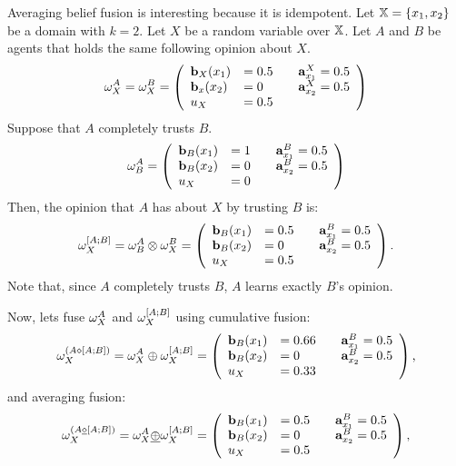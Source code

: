 \documentclass[a4paper,12pt]{article}
\theoremstyle{definition}
\theoremstyle{theorem}
\numberwithin{equation}{section}
\begin{document}
Averaging belief fusion is interesting because it is idempotent. Let $\mathbb{X} = \{x_1, x_2\}$ be a domain with $k = 2$. Let $X$ be a random variable over $\mathbb{X}$. Let $A$ and $B$ be agents that holds the same following opinion about $X$.
\begin{equation}
\omega^{A}_{X} = \omega^{B}_{X} =
\left(
\begin{array}{llll}
\mathbf{b}_{X}(x_1) & = 0.5 & & \mathbf{a}^{X}_{x_1} = 0.5 \\
\mathbf{b}_{x}(x_2) & = 0 & & \mathbf{a}^{X}_{x_2} = 0.5 \\
u_X & = 0.5
\end{array}
\right)
\end{equation}
Suppose that $A$ completely trusts $B$.
\begin{equation}
\omega^{A}_{B} =
\left(
\begin{array}{llll}
\mathbf{b}_{B}(x_1) & = 1 & & \mathbf{a}^{B}_{x_1} = 0.5 \\
\mathbf{b}_{B}(x_2) & = 0 & & \mathbf{a}^{B}_{x_2} = 0.5 \\
u_X & = 0
\end{array}
\right)
\end{equation}
Then, the opinion that $A$ has about $X$ by trusting $B$ is:
\begin{equation}
\omega^{[A;B]}_{X} = \omega^{A}_{B} \otimes \omega^{B}_{X} =
\left(
\begin{array}{llll}
\mathbf{b}_{B}(x_1) & = 0.5 & & \mathbf{a}^{B}_{x_1} = 0.5 \\
\mathbf{b}_{B}(x_2) & = 0 & & \mathbf{a}^{B}_{x_2} = 0.5 \\
u_X & = 0.5
\end{array}
\right) \text{.}
\end{equation}
Note that, since $A$ completely trusts $B$, $A$ learns exactly $B$'s opinion.

Now, lets fuse $\omega^{A}_{X}$ and $\omega^{[A;B]}_{X}$ using cumulative fusion:
\begin{equation}
\omega^{(A \diamond [A; B])}_{X} = \omega^{A}_{X} \oplus \omega^{[A;B]}_{X} =\left(
\begin{array}{llll}
\mathbf{b}_{B}(x_1) & = 0.66 & & \mathbf{a}^{B}_{x_1} = 0.5 \\
\mathbf{b}_{B}(x_2) & = 0 & & \mathbf{a}^{B}_{x_2} = 0.5 \\
u_X & = 0.33
\end{array}
\right) \text{,}
\end{equation}
and averaging fusion:
\begin{equation}
\omega^{(A \underline{\diamond} [A; B])}_{X} = \omega^{A}_{X} \underline{\oplus} \omega^{[A;B]}_{X} =\left(
\begin{array}{llll}
\mathbf{b}_{B}(x_1) & = 0.5 & & \mathbf{a}^{B}_{x_1} = 0.5 \\
\mathbf{b}_{B}(x_2) & = 0 & & \mathbf{a}^{B}_{x_2} = 0.5 \\
u_X & = 0.5
\end{array}
\right) \text{,}
\end{equation}
\end{document}
